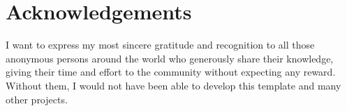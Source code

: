 \chapter*{Acknowledgements}

I want to express my most sincere gratitude and recognition to all those anonymous persons around the world who generously share their knowledge, giving their time and effort to the community without expecting any reward. Without them, I would not have been able to develop this template and many other projects.


